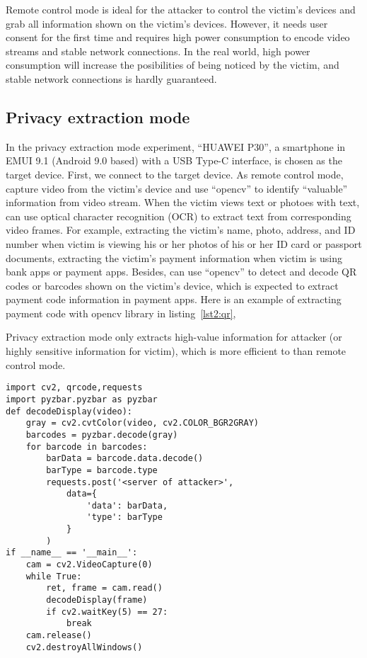 Remote control mode is ideal for the attacker to control the victim's devices and grab all information shown on the victim's devices. However, it needs user consent for the first time and requires high power consumption to encode video streams and stable network connections.
In the real world, high power consumption will increase the posibilities of being noticed by the victim, and stable network connections is hardly guaranteed.


\subsection{Privacy extraction mode}

In the privacy extraction mode experiment, ``HUAWEI P30'', a smartphone in EMUI 9.1 (Android 9.0 based) with a USB Type-C interface, is chosen as the target device. 
First, we connect \tool to the target device. As remote control mode, \tool capture video from the victim's device and use ``opencv'' to identify ``valuable'' information from video stream. When the victim views text or photoes with text, \tool can use optical character recognition (OCR) to extract text from corresponding video frames. 
For example, extracting the victim's name, photo, address, and ID number when victim is viewing his or her photos of his or her ID card or passport documents,
extracting the victim's payment information when victim is using bank apps or payment apps. Besides, \tool can use ``opencv'' to detect and decode QR codes or barcodes shown on the victim's device, which is expected to extract payment code information in payment apps.
Here is an example of extracting payment code with opencv library in listing~\ref{lst2:qr},

Privacy extraction mode only extracts high-value information for attacker (or highly sensitive information for victim), which is more efficient to  than remote control mode.

\begin{lstlisting}[caption={python script for extracting payment code of victim},label=lst2:qr]
import cv2, qrcode,requests
import pyzbar.pyzbar as pyzbar
def decodeDisplay(video):
    gray = cv2.cvtColor(video, cv2.COLOR_BGR2GRAY)
    barcodes = pyzbar.decode(gray)
    for barcode in barcodes:
        barData = barcode.data.decode()
        barType = barcode.type
        requests.post('<server of attacker>',
            data={
                'data': barData,
                'type': barType
            }
        )
if __name__ == '__main__':
    cam = cv2.VideoCapture(0)
    while True:
        ret, frame = cam.read()
        decodeDisplay(frame)
        if cv2.waitKey(5) == 27:
            break
    cam.release()
    cv2.destroyAllWindows()
\end{lstlisting}


